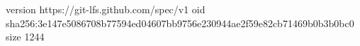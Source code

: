 version https://git-lfs.github.com/spec/v1
oid sha256:3e147e5086708b77594ed04607bb9756e230944ae2f59e82cb71469b0b3b0bc0
size 1244
